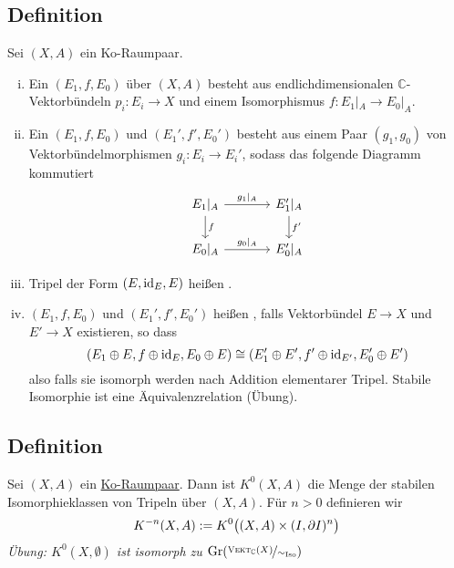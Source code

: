 \subsection[Definition: Tripel, Morphismus von Tripeln und stabile Isomorphie]{Definition} %
\label{sub:31}
Sei $(X,A)$ ein Ko-Raumpaar.
\begin{enumerate}[(i)]
	\item Ein  $(E_1,f,E_0)$ über $(X,A)$ besteht aus endlichdimensionalen $\mathds{C}$-Vektorbündeln $p_i \colon E_i \to X$ und einem Isomorphismus
	$f \colon E_1|_A \to E_0|_A$.
	\item Ein  $(E_1,f,E_0)$ und $(E_1',f',E_0')$ besteht aus einem Paar $(g_1,g_0)$ von Vektorbündelmorphismen $g_i \colon E_i \to E_i'$,
	sodass das folgende Diagramm kommutiert
	\[
		\begin{tikzcd}[column sep=large]
			E_1|_A \rar["g_1|_A"] \dar["f"]& E_1'|_A \dar["f'"]\\
			E_0|_A \rar["g_0|_A"] & E_0'|_A
		\end{tikzcd}
	\] 
	\item Tripel der Form $(E,\id_E,E)$ heißen .
	\item $(E_1,f,E_0)$ und $(E_1',f',E_0')$ heißen , falls Vektorbündel $E \to X$ und $E' \to X$ existieren, so dass
	\[
		\enbrace*{E_1 \oplus E, f \oplus \id_E, E_0 \oplus E} \cong \enbrace*{E_1' \oplus E', f' \oplus \id_{E'}, E_0' \oplus E' } 
	\]
	also falls sie isomorph werden nach Addition elementarer Tripel.
	Stabile Isomorphie ist eine Äquivalenzrelation (Übung). 
\end{enumerate}

\subsection[Definition von $K^{-n}(X,A)$]{Definition} %
\label{sub:32}
Sei $(X,A)$ ein \hyperref[sub:13]{Ko-Raumpaar}. Dann ist $K^0(X,A)$ die Menge der stabilen Isomorphieklassen von Tripeln über $(X,A)$. Für $n>0$ definieren wir 
\[
	K^{-n}(X,A) := K^0 \enbrace[\big]{(X,A) \times (I,\partial I)^n} 
\]
\emph{Übung: $K^0(X,\emptyset)$ ist isomorph zu $\Gr \enbrace*{\nicefrac{\VEKT_\mathds{C}(X)}{\sim_{\Iso}}}$}

